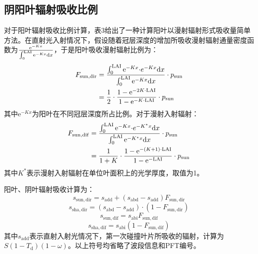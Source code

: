 \subsection{阴阳叶辐射吸收比例}
对于阳叶辐射吸收比例计算，\citet{yuan20143d}表3给出了一种计算阳叶以漫射辐射形式吸收量简单方法。在直射光入射情况下，假设随着冠层深度的增加所吸收漫射辐射通量密度函数为\(\frac{{\mathrm e}^{- Kx}}{\int_{0}^{{\rm LAI}}{{\mathrm e}^{- Kx}\mathrm{d}x}}\)，于是阳叶吸收漫射辐射比例为：
%
\begin{equation}
  \begin{aligned}
    F_{\mathrm{sun,dir}} &= \frac{\int_{0}^{{\rm LAI}}{{\mathrm e}^{- Kx}{\cdot e}^{- Kx}\mathrm{d}x}}{\int_{0}^{{\rm LAI}}{{\mathrm e}^{- Kx}\mathrm{d}x}} \cdot p_{\mathrm{sun}} \\
    &=\frac{1}{2}\cdot\frac{1-{\mathrm e}^{-2K\cdot {\rm LAI}}}{1-{\mathrm e}^{-K\cdot {\rm LAI}}}\cdot p_{\mathrm{sun}}
  \end{aligned}
\end{equation}
%
其中\({\mathrm e}^{- Kx}\)为阳叶在不同冠层深度所占比例。对于漫射入射辐射：
%
\begin{equation}
  \begin{aligned}
    F_{\mathrm{sun,dif}} &= \frac{\int_{0}^{{\rm LAI}}{{\mathrm e}^{- Kx}{\cdot e}^{- K^{*}x}\mathrm{d}x}}{\int_{0}^{{\rm LAI}}{{\mathrm e}^{- K^{*}x}\mathrm{d}x}} \cdot p_{\mathrm{sun}} \\
    &=\frac{1}{1+K}\cdot\frac{1-{\mathrm e}^{-(K+1)\cdot {\rm LAI}}}{1-{\mathrm e}^{-{\rm LAI}}}\cdot p_{\mathrm{sun}}
  \end{aligned}
\end{equation}
%
其中\(K^{*}\)表示漫射入射辐射在单位叶面积上的光学厚度，取值为1。

阳叶、阴叶辐射吸收计算为：
%
\begin{equation}
  s_{\mathrm{sun,dir}} = s_{\mathrm{add}} + \left( s_{\mathrm{abd}} - s_{\mathrm{add}} \right)F_{\mathrm{sun,dir}}
\end{equation}
%
\begin{equation}
  s_{\mathrm{sha,dir}} = \left( s_{\mathrm{abd}} - s_{\mathrm{add}} \right) \cdot \left( 1 - F_{\mathrm{sun,dir}} \right)
\end{equation}
%
\begin{equation}
  s_{\mathrm{sun,dif}} = s_{\mathrm{abi}}F_{\mathrm{sun,dif}}
\end{equation}
%
\begin{equation}
  s_{\mathrm{sha,dif}} = s_{\mathrm{abi}}\left( 1 - F_{\mathrm{sun,dif}} \right)
\end{equation}
%
其中\(s_{\mathrm{add}}\)表示直射入射光情况下，第一次碰撞叶片所吸收的辐射，计算为$ S\left(1 - T_{\mathrm d} \right )\left( 1 - \omega \right )$。以上符号均省略了波段信息和PFT编号。


